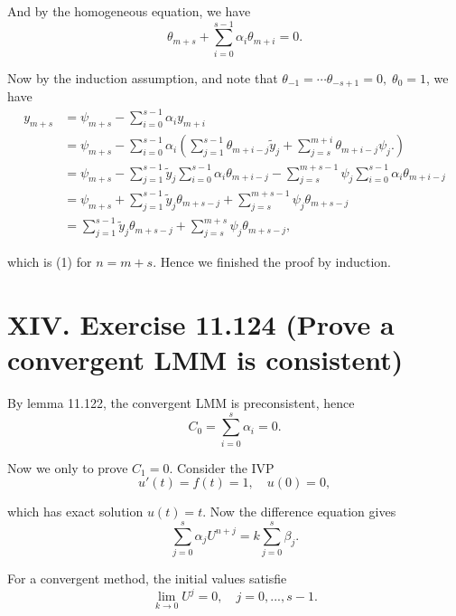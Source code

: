 \documentclass[twoside,a4paper]{article}
\begin{document}
And by the homogeneous equation, we have
\begin{equation*}
    \theta_{m+s}+\sum_{i=0}^{s-1} \alpha_i\theta_{m+i}=0.
\end{equation*}

Now by the induction assumption, and note that $\theta_{-1}=\cdots \theta_{-s+1}=0,\;\theta_0=1$, we have
\begin{align*}
    y_{m+s}&=\psi_{m+s}-\sum_{i=0}^{s-1} \alpha_iy_{m+i}\\
    &=\psi_{m+s}-\sum_{i=0}^{s-1} \alpha_i\left(\sum_{j=1}^{s-1}\theta_{m+i-j}\tilde{y}_j + \sum_{j=s}^{m+i} \theta_{m+i-j}\psi_j.\right)\\
    &=\psi_{m+s}-\sum_{j=1}^{s-1}\tilde{y}_j\sum_{i=0}^{s-1} \alpha_i\theta_{m+i-j} - \sum_{j=s}^{m+s-1}\psi_j \sum_{i=0}^{s-1} \alpha_i \theta_{m+i-j}\\
    &=\psi_{m+s}+\sum_{j=1}^{s-1}\tilde{y}_j\theta_{m+s-j} + \sum_{j=s}^{m+s-1}\psi_j\theta_{m+s-j}\\
    &=\sum_{j=1}^{s-1}\tilde{y}_j\theta_{m+s-j} + \sum_{j=s}^{m+s}\psi_j\theta_{m+s-j},
\end{align*}

which is (1) for $n=m+s$. Hence we finished the proof by induction.

\section*{XIV. Exercise 11.124 (Prove a convergent LMM is consistent)}

\;\;\;\; By lemma 11.122, the convergent LMM is preconsistent, hence
\begin{equation*}
    C_0=\sum_{i=0}^s \alpha_i = 0.
\end{equation*}

Now we only to prove $C_1=0$. Consider the IVP
\begin{equation*}
    u'(t)=f(t)=1,\quad u(0)=0,
\end{equation*}

which has exact solution $u(t)=t$. Now the difference equation gives
\begin{equation}
    \sum_{j=0}^s \alpha_j U^{n+j} = k\sum_{j=0}^s \beta_j.
\end{equation}

For a convergent method, the initial values satisfie
\begin{equation}
    \lim_{k\to 0} U^{j}=0,\quad j=0,...,s-1.
\end{equation}
\end{document}

